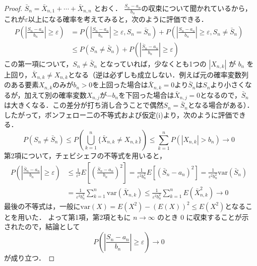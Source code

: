 \documentclass[dvipdfmx]{jsarticle}
\numberwithin{equation}{section}
\theoremstyle{definition}
\newcommand{\0}{\bm{0}}
\newcommand{\1}{\bm{1}}
\begin{document}
\begin{proof}
  $\bar{S}_n = \bar{X}_{n,1} + \cdots + \bar{X}_{n,n}$ とおく．
  $\frac{S_n - a_n}{b_n}$の収束について聞かれているから，これが$\varepsilon$以上になる確率を考えてみると，次のように評価できる．
  \begin{align*}
    P\left(\left|\frac{S_n - a_n}{b_n}\right| \ge \varepsilon\right)
    &=P\left(\left|\frac{S_n - a_n}{b_n}\right| \ge \varepsilon, S_n = \bar{S}_n\right) + P\left(\left|\frac{S_n - a_n}{b_n}\right| \ge \varepsilon, S_n \neq \bar{S}_n\right)\\
    &\le P(S_n \neq \bar{S}_n) + P\left(\left|\frac{\bar{S}_n - a_n}{b_n}\right| \ge \varepsilon\right)
  \end{align*}
  この第一項について，$S_n \neq \bar{S}_n$ となっていれば，少なくとも1つの $|X_{n,k}|$ が $b_n$ を上回り，$\bar{X}_{n,k} \neq X_{n,k}$となる（逆は必ずしも成立しない．例えば元の確率変数列のある要素$X_{n,k}$のみが$b_n>0$を上回った場合は$\bar{X}_{n,k}=0$より$\bar{S}_n$は$S_n$より小さくなるが，加えて別の確率変数$X_{n,j}$が$-b_n$を下回った場合は$\bar{X}_{n,j} = 0$となるので，$\bar{S}_n$は大きくなる．この差分が打ち消し合うことで偶然$S_n = \bar{S}_n$となる場合がある）．\\したがって，ボンフェロー二の不等式および仮定(i)より，次のように評価できる．
  \[
    P(S_n \neq \bar{S}_n) \leq P\left(\bigcup_{k=1}^n \{\bar{X}_{n,k} \neq X_{n,k}\}\right) \le \sum_{k=1}^n P(|X_{n,k}| > b_n) \to 0
  \]
  第2項について，チェビシェフの不等式を用いると，
  \begin{align*}
  P\left(\left|\frac{\bar{S}_n - a_n}{b_n}\right| \ge \varepsilon\right) 
  &\le \frac{1}{\varepsilon^2} E\left[\left(\frac{\bar{S}_n - a_n}{b_n}\right)^2\right] = \frac{1}{\varepsilon^2 b_n^2} E\left[(\bar{S}_n - a_n)^2\right] = \frac{1}{\varepsilon^2 b_n^2} \mathrm{var}(\bar{S}_n)\\
  &= \frac{1}{\varepsilon^2 b_n^2} \sum_{k=1}^n \mathrm{var}(\bar{X}_{n,k}) \le \frac{1}{\varepsilon^2 b_n^2} \sum_{k=1}^n E(\bar{X}_{n,k}^2) \to 0
  \end{align*}
  最後の不等式は，一般に$\mathrm{var}(X)=E(X^2) - (E(X))^2 \leq E(X^2)$となることを用いた．
  よって第1項，第2項ともに $n \to \infty$ のとき $0$ に収束することが示されたので，結論として
  \[
    P\left(\left|\frac{S_n - a_n}{b_n}\right| \ge \varepsilon\right) \to 0
  \]
  が成り立つ．
\end{proof}
\end{document}
